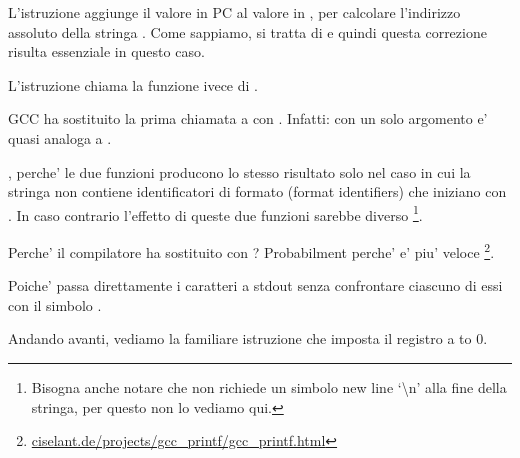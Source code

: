 L'istruzione  aggiunge il valore in \ac{PC} al valore in , per calcolare l'indirizzo assoluto della stringa . 
Come sappiamo, si tratta di \q{\PICcode} e quindi questa correzione risulta essenziale in questo caso.

L'istruzione  chiama la funzione \puts ivece di \printf.

\label{puts}

GCC ha sostituito la prima chiamata a \printf con \puts.
Infatti: \printf con un solo argomento e' quasi analoga a \puts. 

, perche' le due funzioni producono lo stesso risultato solo nel caso in cui la stringa non contiene 
identificatori di formato (format identifiers) che iniziano con \IT{\%}. 
In caso contrario l'effetto di queste due funzioni sarebbe diverso
\footnote{Bisogna anche notare che \puts non richiede un simbolo new line `\textbackslash{}n' alla fine della stringa,
per questo non lo vediamo qui.}.

Perche' il compilatore ha sostituito \printf con \puts? Probabilment perche' \puts e' piu' veloce
\footnote{\href{http://go.yurichev.com/17063}{ciselant.de/projects/gcc\_printf/gcc\_printf.html}}. 

Poiche' passa direttamente i caratteri a \gls{stdout} senza confrontare ciascuno di essi con il simbolo \IT{\%}.

Andando avanti, vediamo la familiare istruzione  che imposta il registro  a to 0.
